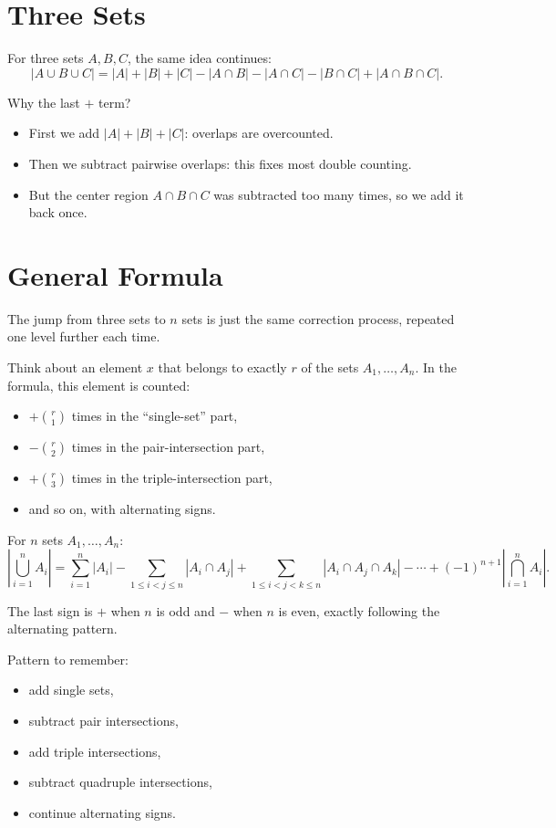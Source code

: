 \section{Three Sets}
For three sets \(A,B,C\), the same idea continues:
\[
  |A\cup B\cup C|
  = |A|+|B|+|C|
  - |A\cap B|-|A\cap C|-|B\cap C|
  + |A\cap B\cap C|.
\]

Why the last \(+\) term?
\begin{itemize}
  \item First we add \(|A|+|B|+|C|\): overlaps are overcounted.
  \item Then we subtract pairwise overlaps: this fixes most double counting.
  \item But the center region \(A\cap B\cap C\) was subtracted too many times,
        so we add it back once.
\end{itemize}

\section{General Formula}
The jump from three sets to \(n\) sets is just the same correction process,
repeated one level further each time.

Think about an element \(x\) that belongs to exactly \(r\) of the sets
\(A_1,\dots,A_n\).  In the formula, this element is counted:
\begin{itemize}
  \item \(+\binom{r}{1}\) times in the ``single-set'' part,
  \item \(-\binom{r}{2}\) times in the pair-intersection part,
  \item \(+\binom{r}{3}\) times in the triple-intersection part,
  \item and so on, with alternating signs.
\end{itemize}
For \(n\) sets \(A_1,\dots,A_n\):
\[
  \left|\bigcup_{i=1}^{n} A_i\right|
  =
  \sum_{i=1}^{n}|A_i|
  - \sum_{1\le i<j\le n}|A_i\cap A_j|
  + \sum_{1\le i<j<k\le n}|A_i\cap A_j\cap A_k|
  - \cdots
  + (-1)^{n+1}\left|\bigcap_{i=1}^{n}A_i\right|.
\]

The last sign is \(+\) when \(n\) is odd and \(-\) when \(n\) is even, exactly
following the alternating pattern.

Pattern to remember:
\begin{itemize}
  \item add single sets,
  \item subtract pair intersections,
  \item add triple intersections,
  \item subtract quadruple intersections,
  \item continue alternating signs.
\end{itemize}

